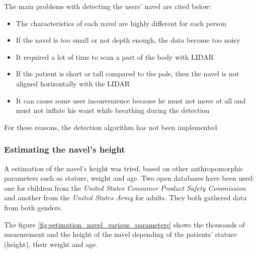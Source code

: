 \documentclass{article}
\newcommand{\vsp}{\vspace{\baselineskip}}
\begin{document}
The main problems with detecting the users' navel are cited below:

\begin{itemize}
    \item The characteristics of each navel are highly different for each person
    \item If the navel is too small or not depth enough, the data become too noisy
    \item It required a lot of time to scan a part of the body with LIDAR
    \item If the patient is short or tall compared to the pole, then the navel is not aligned horizontally with the LIDAR
    \item It can cause some user inconvenience because he must not move at all and must not inflate his waist while breathing during the detection
\end{itemize}

For these reasons, the detection algorithm has not been implemented

\subsubsection{Estimating the navel's height}

A estimation of the navel's height was tried, based on other anthropomorphic parameters such as stature, weight and age. Two open databases have been used: one for children from the \textit{United States Consumer Product Safety Commission} \cite{database_cpsc_children} and another from the \textit{United States Army} \cite{database_ansur2} for adults. They both gathered data from both genders. 

\vsp

The figure \ref{fig:estimation_navel_various_parameters} shows the thousands of measurement and the height of the navel depending of the patients' stature (height), their weight and age. 
\end{document}

